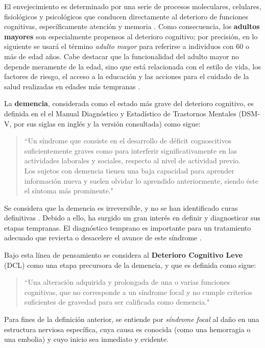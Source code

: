 \documentclass[12pt,letterpaper,draft]{book}
\begin{document}
El envejecimiento es determinado por una serie de procesos moleculares, celulares, fisiológicos y psicológicos que conducen directamente al deterioro de funciones cognitivas, específicamente atención y memoria \cite{Park09}.
%
Como consecuencia, los \textbf{adultos mayores} son especialmente propensos al deterioro cognitivo; por precisión, en lo siguiente se usará el término \textit{adulto mayor} para referirse a individuos con 60 o más de edad años.
%
Cabe destacar que la funcionalidad del adulto mayor no depende meramente de la edad, sino que está relacionada con el estilo de vida, los factores de riesgo, el acceso a la educación y las acciones para el cuidado de la salud realizadas en edades más tempranas \cite{Sanhueza14}.
 
La \textbf{demencia}, considerada como el estado más grave del deterioro cognitivo, es definida en el el Manual Diagnóstico y Estadístico de Trastornos Mentales (DSM-V, por sus siglas en inglés y la versión consultada) como sigue:
\begin{quote}
``Un síndrome que consiste en el desarrollo de déficit cognoscitivos suficientemente graves como para 
interferir significativamente en las actividades laborales y sociales, respecto al nivel de 
actividad previo.\\
%
Los sujetos con demencia tienen una baja capacidad para aprender información nueva y suelen olvidar 
lo aprendido anteriormente, siendo éste el síntoma más prominente."  \cite{DCM5}
\end{quote}

Se considera que la demencia es irreversible, y no se han identificado curas definitivas \cite{PlanAlzheimer04}. 
%
Debido a ello, ha surgido un gran interés en definir y diagnosticar sus etapas tempranas. 
%
El diagnóstico temprano es importante para un tratamiento adecuado que revierta o desacelere el avance de este síndrome \cite{Knopman01}.

Bajo esta línea de pensamiento se considera al \textbf{Deterioro Cognitivo Leve} (DCL) como una etapa precursora de la demencia, y que es definida como sigue: 
\begin{quote}
``Una alteración adquirida y prolongada de una o varias funciones cognitivas, que no corresponde a un 
síndrome focal y no cumple criterios suficientes de gravedad para ser calificada como demencia."
\cite{Robles02}
\end{quote}

Para fines de la definición anterior, se entiende por \textit{síndrome focal} al daño en una estructura nerviosa específica, cuya causa es conocida (como una hemorragia o una embolia) y cuyo inicio sea inmediato y evidente. 
\end{document}
